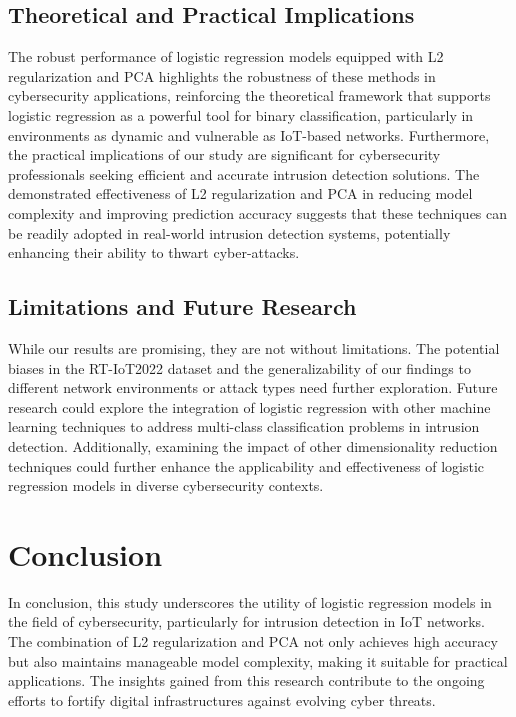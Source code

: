 \documentclass[a4paper,10pt,twocolumn]{article}
\begin{document}
\subsection{Theoretical and Practical Implications}
The robust performance of logistic regression models equipped with L2 regularization and PCA highlights the robustness of these methods in cybersecurity applications, reinforcing the theoretical framework that supports logistic regression as a powerful tool for binary classification, particularly in environments as dynamic and vulnerable as IoT-based networks. Furthermore, the practical implications of our study are significant for cybersecurity professionals seeking efficient and accurate intrusion detection solutions. The demonstrated effectiveness of L2 regularization and PCA in reducing model complexity and improving prediction accuracy suggests that these techniques can be readily adopted in real-world intrusion detection systems, potentially enhancing their ability to thwart cyber-attacks.

\subsection{Limitations and Future Research}
While our results are promising, they are not without limitations. The potential biases in the RT-IoT2022 dataset and the generalizability of our findings to different network environments or attack types need further exploration. Future research could explore the integration of logistic regression with other machine learning techniques to address multi-class classification problems in intrusion detection. Additionally, examining the impact of other dimensionality reduction techniques could further enhance the applicability and effectiveness of logistic regression models in diverse cybersecurity contexts.

\section{Conclusion}
\label{sec:conclusion}

In conclusion, this study underscores the utility of logistic regression models in the field of cybersecurity, particularly for intrusion detection in IoT networks. The combination of L2 regularization and PCA not only achieves high accuracy but also maintains manageable model complexity, making it suitable for practical applications. The insights gained from this research contribute to the ongoing efforts to fortify digital infrastructures against evolving cyber threats.


\end{document}
